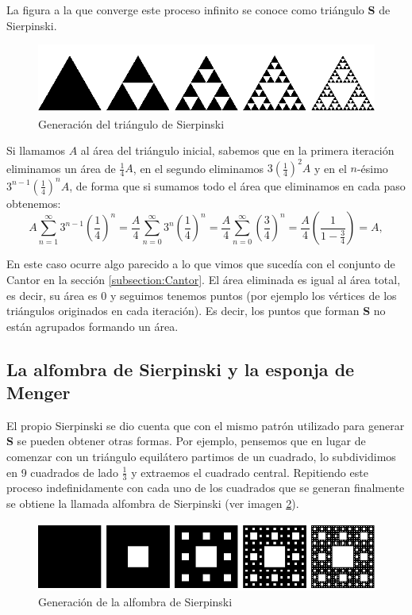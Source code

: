 La figura a la que converge este proceso infinito se conoce como triángulo \textbf{S} de Sierpinski.

\begin{figure} [ht]
\centering
\includegraphics[scale = 0.6]{img/Sierpinski-triangle.png}
\caption{Generación del triángulo de Sierpinski}
 \label{fig:triangulo-Sierpinski}
\end{figure}

Si llamamos $A$ al área del triángulo inicial, sabemos que en la primera iteración eliminamos un área de $\frac 1 4 A$, en el segundo eliminamos $3 \left(\frac 1 4\right)^2 A$ y en el $n$-ésimo $3^{n-1}\left(\frac 1 4\right)^n A$, de forma que si sumamos todo el área que eliminamos en cada paso obtenemos:
$$
A \sum_{n=1}^\infty 3^{n-1}\left(\frac 1 4\right)^n  = \frac A 4  \sum_{n=0}^\infty 3^n\left(\frac 1 4\right)^n =  \frac A 4  \sum_{n=0}^\infty \left(\frac 3 4\right)^n = \frac{A}{4} \left(\frac{1}{1-\frac{3}{4}}\right) = A,
$$

En este caso ocurre algo parecido a lo que vimos que sucedía con el conjunto de Cantor en la sección \ref{subsection:Cantor}. El área eliminada es igual al área total, es decir, su área es 0 y seguimos tenemos puntos (por ejemplo los vértices de los triángulos originados en cada iteración). Es decir, los puntos que forman \textbf{S} no están agrupados formando un área.

\subsection{La alfombra de Sierpinski y la esponja de Menger}
\label{subsection:alfombra-esponja}

El propio Sierpinski se dio cuenta que con el mismo patrón utilizado para generar \textbf{S} se pueden obtener otras formas. Por ejemplo, pensemos que en lugar de comenzar con un triángulo equilátero partimos de un cuadrado, lo subdividimos en 9 cuadrados de lado $\frac 1 3$ y extraemos el cuadrado central. Repitiendo este proceso indefinidamente con cada uno de los cuadrados que se generan finalmente se obtiene la llamada alfombra de Sierpinski (ver imagen \ref{fig:alfombra-Sierpinski}).

\begin{figure} [ht]
\centering
\includegraphics[scale = 0.6]{img/Sierpinski-carpet.png}
\caption{Generación de la alfombra de Sierpinski}
 \label{fig:alfombra-Sierpinski}
\end{figure}

